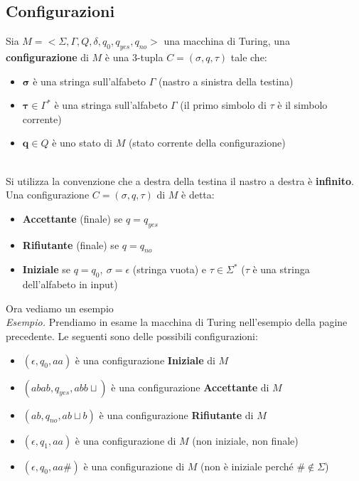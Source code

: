 \subsection{Configurazioni}\label{conf}
\colorbox{SALZO}{\parbox{\dimexpr\linewidth-2\fboxsep}{\begin{definition}
   Sia $M = <\Sigma, \Gamma,Q,\delta,q_0,q_{yes},q_{no}>$ una macchina di Turing, una \textbf{configurazione} di $M$ è una 3-tupla
   $C= (\sigma,q,\tau)$ tale che:
   \begin{itemize}
    \item $\bm{\sigma}$ è una stringa sull'alfabeto $\Gamma$ (nastro a sinistra della testina)
    \item $\bm{\tau} \in \Gamma^*$ è una stringa sull'alfabeto $\Gamma$ (il primo simbolo di $\tau$ è il simbolo corrente)
    \item $\bm{q} \in Q$ è uno stato di $M$ (stato corrente della configurazione)
   \end{itemize}
\end{definition}}}\smallskip\\
Si utilizza la convenzione che a destra della testina il nastro a destra è \textbf{infinito}.\\
Una configurazione $C = (\sigma,q,\tau)$ di $M$ è detta:
\begin{itemize}
    \item \textbf{Accettante} (finale) se $q = q_{yes}$
    \item \textbf{Rifiutante} (finale) se $q = q_{no}$
    \item \textbf{Iniziale} se $q = q_0,\ \sigma = \epsilon$ (stringa vuota) e $\tau \in \Sigma^*$ ($\tau$ è una stringa dell'alfabeto in input)
\end{itemize}
Ora vediamo un esempio\smallskip\\
\textit{Esempio.} Prendiamo in esame la macchina di Turing nell'esempio della pagine precedente. Le seguenti sono delle possibili configurazioni:
\begin{itemize}
    \item[-] $(\epsilon, q_0, aa)$ è una configurazione \textbf{Iniziale} di $M$
    \item[-] $(abab, q_{yes}, abb \sqcup)$ è una configurazione \textbf{Accettante} di $M$
    \item[-] $(ab, q_{no}, ab \sqcup b)$ è una configurazione \textbf{Rifiutante} di $M$
    \item[-] $(\epsilon, q_1, aa)$ è una configurazione di $M$ (non iniziale, non finale)
    \item[-] $(\epsilon, q_0, aa\#)$ è una configurazione di $M$ (non è iniziale perché $\# \notin \Sigma$)
\end{itemize}




